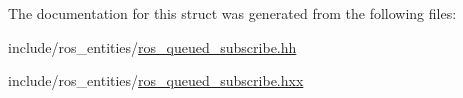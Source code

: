 The documentation for this struct was generated from the following files\+:\begin{DoxyCompactItemize}
\item 
include/ros\+\_\+entities/\hyperlink{ros__queued__subscribe_8hh}{ros\+\_\+queued\+\_\+subscribe.\+hh}\item 
include/ros\+\_\+entities/\hyperlink{ros__queued__subscribe_8hxx}{ros\+\_\+queued\+\_\+subscribe.\+hxx}\end{DoxyCompactItemize}
